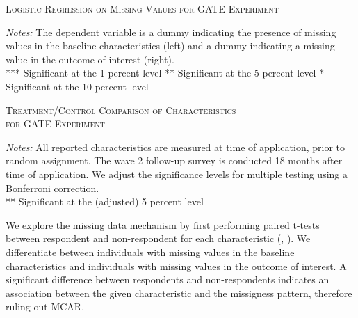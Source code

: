 \begin{table}[t!]
\centering
\caption{\textsc{Logistic Regression on Missing Values for GATE Experiment}}
\begin{adjustbox}{width=\textwidth,totalheight=\textheight,keepaspectratio}

\end{adjustbox}


\label{tab:table_logistic}
\medskip
\raggedright
\footnotesize
\textit{Notes:} The dependent variable is a dummy indicating the presence of missing values in the baseline characteristics (left) and a dummy indicating a missing value in the outcome of interest (right). \\
*** Significant at the 1 percent level ** Significant at the 5 percent level * Significant at the 10 percent level
\end{table}

\begin{table}[t!]
\centering
\caption{\textsc{Treatment/Control Comparison of Characteristics \\ for GATE Experiment}}
\begin{adjustbox}{width=\textwidth, totalheight=\textheight, keepaspectratio}

\end{adjustbox}


\label{tab:table_integrity}
\medskip
\raggedright
\footnotesize
\textit{Notes:} All reported characteristics are measured at time of application, prior to random assignment. The wave 2 follow-up survey is conducted 18 months after time of application. We adjust the significance levels for multiple testing using a Bonferroni correction. \\
** Significant at the (adjusted) 5 percent level
\end{table}

We explore the missing data mechanism by first performing paired t-tests between respondent and non-respondent for each characteristic (\cite{acock2005}, \cite{huisman1998}). We differentiate between individuals with missing values in the baseline characteristics and individuals with missing values in the outcome of interest. A significant difference between respondents and non-respondents indicates an association between the given characteristic and the missigness pattern, therefore ruling out MCAR.

